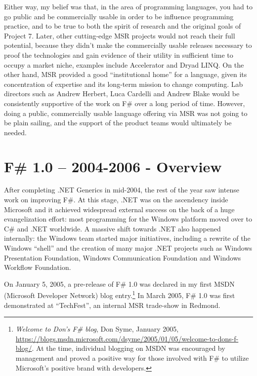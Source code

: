 \documentclass[acmsmall]{acmart}\settopmatter{}
\begin{document}
Either way, my belief was that, in the area of programming languages, you had to go public and be commercially usable in order to be influence programming practice, and to be true to both the spirit of research and the original goals of Project 7. Later, other cutting-edge MSR projects would not reach their full potential, because they didn’t make the commercially usable releases necessary to proof the technologies and gain evidence of their utility in sufficient time to occupy a market niche, examples include Accelerator and Dryad LINQ. On the other hand, MSR provided a good “institutional home” for a language, given its concentration of expertise and its long-term mission to change computing. Lab directors such as Andrew Herbert, Luca Cardelli and Andrew Blake would be consistently supportive of the work on F\# over a long period of time. However, doing a public, commercially usable language offering via MSR was not going to be plain sailing, and the support of the product teams would ultimately be needed.

\section*{F\# 1.0 – 2004-2006 - Overview}

After completing .NET Generics in mid-2004, the rest of the year saw intense work on improving F\#. At this stage, .NET was on the ascendency inside Microsoft and it achieved widespread external success on the back of a huge evangelization effort: most programming for the Windows platform moved over to C\# and .NET worldwide. A massive shift towards .NET also happened internally: the Windows team started major initiatives, including a rewrite of the Windows “shell” and the creation of many major .NET projects such as Windows Presentation Foundation, Windows Communication Foundation and Windows Workflow Foundation.

On January 5, 2005, a pre-release of F\# 1.0 was declared in my first MSDN (Microsoft Developer Network) blog entry.\footnote{\textit{Welcome to Don’s F\# blog}, Don Syme, January 2005, \url{https://blogs.msdn.microsoft.com/dsyme/2005/01/05/welcome-to-dons-f-blog/}. At the time, individual blogging on MSDN was encouraged by management and proved a positive way for those involved with F\# to utilize Microsoft’s positive brand with developers.}  In March 2005, F\# 1.0 was first demonstrated at “TechFest”, an internal MSR trade-show in Redmond.  
\end{document}
